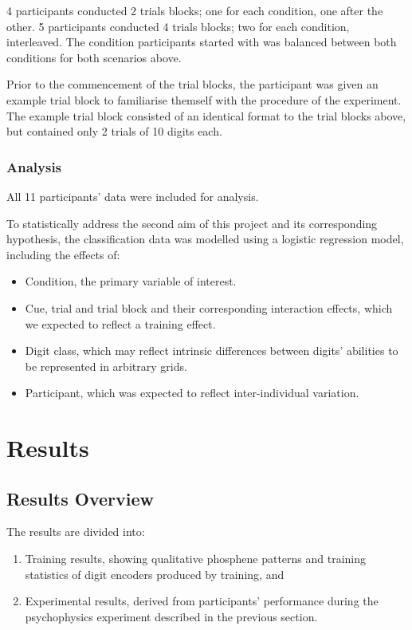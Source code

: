 \documentclass[a4paper,11pt,openany]{book}
\begin{document}
4 participants conducted 2 trials blocks; one for each condition, one after the other.
5 participants conducted 4 trials blocks; two for each condition, interleaved.
The condition participants started with was balanced between both conditions for both scenarios above.

Prior to the commencement of the trial blocks, the participant was given an example trial block to familiarise themself with the procedure of the experiment.
The example trial block consisted of an identical format to the trial blocks above, but contained only 2 trials of 10 digits each.


\section*{Analysis}
\label{sec:orgf960171}

All 11 participants' data were included for analysis.

To statistically address the second aim of this project and its corresponding hypothesis, the classification data was modelled using a logistic regression model, including the effects of:
\begin{itemize}
\item Condition, the primary variable of interest.
\item Cue, trial and trial block and their corresponding interaction effects, which we expected to reflect a training effect.
\item Digit class, which may reflect intrinsic differences between digits' abilities to be represented in arbitrary grids.
\item Participant, which was expected to reflect inter-individual variation.
\end{itemize}

\part{Results}
\label{sec:org8be684a}
\chapter*{Results Overview}
\label{sec:org6efdb20}
The results are divided into:

\begin{enumerate}
\item Training results, showing qualitative phosphene patterns and training statistics of digit encoders produced by training, and
\item Experimental results, derived from participants' performance during the psychophysics experiment described in the previous section.
\end{enumerate}
\end{document}
